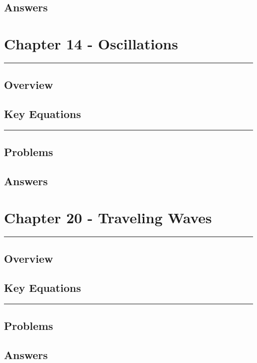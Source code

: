\documentclass[a4paper,12pt]{article}
\begin{document}
\subsection*{Answers}

\pagebreak
\section*{Chapter 14 - Oscillations}
\rule{\linewidth}{1pt}
\subsection*{Overview}
\subsection*{Key Equations}

\begin{center}
  \rule{6cm}{0.5pt}
\end{center}
\subsection*{Problems}
\subsection*{Answers}

\pagebreak
\section*{Chapter 20 - Traveling Waves}
\rule{\linewidth}{1pt}
\subsection*{Overview}
\subsection*{Key Equations}

\begin{center}
  \rule{6cm}{0.5pt}
\end{center}
\subsection*{Problems}
\subsection*{Answers}
\end{document}
